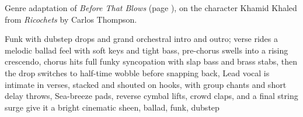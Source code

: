 
\begin{notes}
Genre adaptation of \emph{Before That Blows} (page \pageref{sec:before-that-blows}), on the character Khamid Khaled from \emph{Ricochets} by Carlos Thompson.
\end{notes}
\begin{style}
Funk with dubstep drops and grand orchestral intro and outro; verse rides a melodic ballad feel with soft keys and tight bass, pre-chorus swells into a rising crescendo, chorus hits full funky syncopation with slap bass and brass stabs, then the drop switches to half-time wobble before snapping back, Lead vocal is intimate in verses, stacked and shouted on hooks, with group chants and short delay throws, Sea-breeze pads, reverse cymbal lifts, crowd claps, and a final string surge give it a bright cinematic sheen, ballad, funk, dubstep
\end{style}

